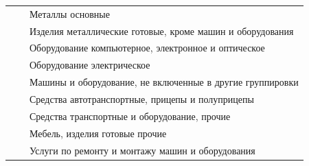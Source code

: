 \documentclass[12pt, a4paper]{article}
\begin{document}
\begin{tabular}[t]{|c|p{6cm}|p{9cm}|}
&& Металлы основные \\ \cline{3-3}
&& Изделия металлические готовые, кроме машин и оборудования \\ \cline{3-3}
&& Оборудование компьютерное, электронное и оптическое \\ \cline{3-3}
&& Оборудование электрическое \\ \cline{3-3}
&& Машины и оборудование, не включенные в другие группировки \\ \cline{3-3}
&& Средства автотранспортные, прицепы и полуприцепы \\ \cline{3-3}
&& Средства транспортные и оборудование, прочие \\ \cline{3-3}
&& Мебель, изделия готовые прочие\\ \cline{3-3}
&& Услуги по ремонту и монтажу машин и оборудования \\ \cline{1-3}

\end{tabular}
\end{document}
